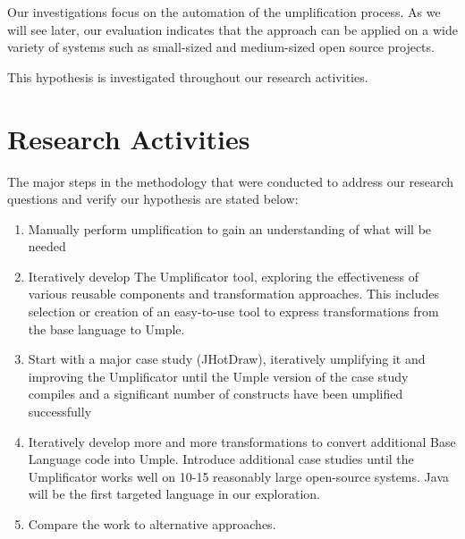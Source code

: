Our investigations focus on the automation of the umplification process. As we will see later, our evaluation indicates that the approach can be applied on a wide variety of systems such as small-sized  and medium-sized open source projects. 


This hypothesis is investigated throughout our research activities.

\section{Research Activities}

The major steps in the methodology that were conducted to address our research questions and verify our hypothesis are stated below:

\begin{enumerate}
\item 	Manually perform umplification to gain an understanding of what will be needed

\item 	Iteratively develop The Umplificator tool, exploring the effectiveness of various reusable components and transformation approaches. This includes selection or creation of an easy-to-use tool to express transformations from the base language to Umple.

\item 	Start with a major case study (JHotDraw), iteratively umplifying it and improving the Umplificator until the Umple version of the case study compiles and a significant number of constructs have been umplified successfully

\item 	Iteratively develop more and more transformations to convert additional Base Language code into Umple. Introduce additional case studies until the Umplificator works well on 10-15 reasonably large open-source systems. Java will be the first targeted language in our exploration. 

\item 	Compare the work to alternative approaches.
\end{enumerate}

